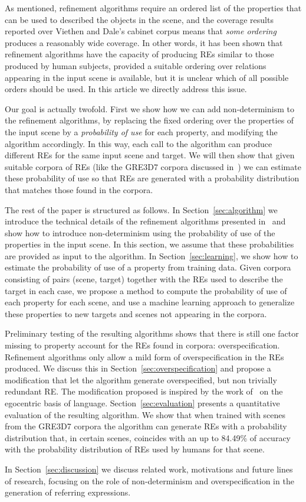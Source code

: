As mentioned, refinement algorithms require an 
ordered list of the properties that can be used to described the objects in the scene, and the coverage results reported over Viethen and 
Dale's cabinet corpus means that \emph{some ordering} produces a reasonably wide coverage.  In other words, it has been shown that refinement algorithms have the capacity of producing REs similar to those produced by human subjects, provided a suitable ordering over relations appearing 
in the input scene is available, but it is unclear which of all possible orders should be used.  In this article we directly address this issue.  

Our goal is actually twofold. First we show how we can add non-determinism to the refinement algorithms, by replacing the fixed ordering 
over the properties of the input scene by a \emph{probability of use} for each property, and modifying the algorithm accordingly.  
In this way, each call to the algorithm can produce different REs for the same input scene and target.  We will then show that given suitable corpora of REs (like the GRE3D7 corpora discussed in~\cite{viet:gene11}) we can estimate these probability of use so that REs are generated with a probability distribution that matches those found in the corpora.  

The rest of the paper is structured as follows. In Section~\ref{sec:algorithm} we introduce the technical details of the 
refinement algorithms presented in~\cite{arec2:2008:Areces,arec:usin11} and show how to introduce non-determinism using 
the probability of use of the properties in the input scene.  In this section, we assume that these probabilities are provided as 
input to the algorithm. In Section~\ref{sec:learning}, we show how to estimate the 
probability of use of a property from training data. Given corpora consisting of pairs (scene, target) together with the REs used to 
describe the target in each case, we propose a method to compute the probability of use of each property for each scene, and use a machine learning approach to generalize these properties to new targets and scenes not appearing in the corpora. 

Preliminary testing of the resulting algorithms shows that there is still one factor missing to property account for the REs found in corpora: overspecification.  Refinement algorithms only allow a mild form of overspecification in the REs produced.  We discuss this in Section~\ref{sec:overspecification} and propose a modification that let the algorithm generate overspecified, but non trivially redundant RE.  The modification proposed is inspired by the work of~ on the egocentric basis of language.  
Section~\ref{sec:evaluation} presents a quantitative evaluation of the resulting algorithm. We show that when trained with scenes from the GRE3D7 corpora the algorithm can generate REs with a probability distribution that, in certain scenes, coincides with an up to 84.49\% of accuracy with the probability distribution of REs used by humans for that scene. 

In Section~\ref{sec:discussion} we discuss related work, motivations and future lines of research, focusing on the role of non-determinism and overspecification in the generation of referring expressions. 


